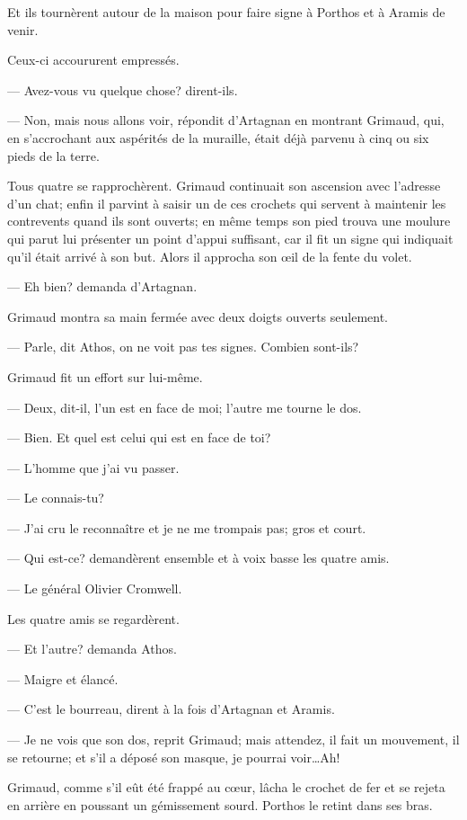Et ils tournèrent autour de la maison pour faire signe à Porthos et à Aramis de venir.

Ceux-ci accoururent empressés.

— Avez-vous vu quelque chose? dirent-ils.

— Non, mais nous allons voir, répondit d'Artagnan en montrant Grimaud, qui, en s'accrochant aux aspérités de la muraille, était déjà parvenu à cinq ou six pieds de la terre.

Tous quatre se rapprochèrent. Grimaud continuait son ascension avec l'adresse d'un chat; enfin il parvint à saisir un de ces crochets qui servent à maintenir les contrevents quand ils sont ouverts; en même temps son pied trouva une moulure qui parut lui présenter un point d'appui suffisant, car il fit un signe qui indiquait qu'il était arrivé à son but. Alors il approcha son œil de la fente du volet.

— Eh bien? demanda d'Artagnan.

Grimaud montra sa main fermée avec deux doigts ouverts seulement.

— Parle, dit Athos, on ne voit pas tes signes. Combien sont-ils?

Grimaud fit un effort sur lui-même.

— Deux, dit-il, l'un est en face de moi; l'autre me tourne le dos.

— Bien. Et quel est celui qui est en face de toi?

— L'homme que j'ai vu passer.

— Le connais-tu?

— J'ai cru le reconnaître et je ne me trompais pas; gros et court.

— Qui est-ce? demandèrent ensemble et à voix basse les quatre amis.

— Le général Olivier Cromwell.

Les quatre amis se regardèrent.

— Et l'autre? demanda Athos.

— Maigre et élancé.

— C'est le bourreau, dirent à la fois d'Artagnan et Aramis.

— Je ne vois que son dos, reprit Grimaud; mais attendez, il fait un mouvement, il se retourne; et s'il a déposé son masque, je pourrai voir\dots Ah!

Grimaud, comme s'il eût été frappé au cœur, lâcha le crochet de fer et se rejeta en arrière en poussant un gémissement sourd. Porthos le retint dans ses bras.

